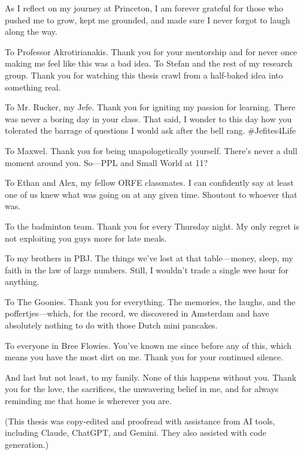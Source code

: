 As I reflect on my journey at Princeton, I am forever grateful for those who pushed me to grow, kept me grounded, and made sure I never forgot to laugh along the way.

To Professor Akrotirianakis. Thank you for your mentorship and for never once making me feel like this was a bad idea. To Stefan and the rest of my research group. Thank you for watching this thesis crawl from a half-baked idea into something real.

To Mr. Rucker, my Jefe. Thank you for igniting my passion for learning. There was never a boring day in your class. That said, I wonder to this day how you tolerated the barrage of questions I would ask after the bell rang. \#Jefites4Life

To Maxwel. Thank you for being unapologetically yourself. There's never a dull moment around you. So---PPL and Small World at 11?

To Ethan and Alex, my fellow ORFE classmates. I can confidently say at least one of us knew what was going on at any given time. Shoutout to whoever that was.

To the badminton team. Thank you for every Thursday night. My only regret is not exploiting you guys more for late meals.

To my brothers in PBJ. The things we've lost at that table---money, sleep, my faith in the law of large numbers. Still, I wouldn't trade a single wee hour for anything.

To The Goonies. Thank you for everything. The memories, the laughs, and the poffertjes---which, for the record, we discovered in Amsterdam and have absolutely nothing to do with those Dutch mini pancakes.

To everyone in Bree Flowies. You've known me since before any of this, which means you have the most dirt on me. Thank you for your continued silence.

And last but not least, to my family. None of this happens without you. Thank you for the love, the sacrifices, the unwavering belief in me, and for always reminding me that home is wherever you are.

(This thesis was copy-edited and proofread with assistance from AI tools, including Claude, ChatGPT, and Gemini. They also assisted with code generation.)
